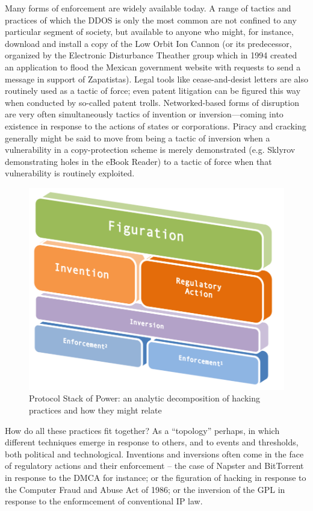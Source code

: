 \documentclass[10pt,letter,oneside]{scrartcl}
\begin{document}
Many forms of enforcement are widely available today.  A range of tactics and
practices of which the DDOS is only the most common are not confined to any
particular segment of society, but available to anyone who might, for instance,
download and install a copy of the Low Orbit Ion Cannon (or its predecessor,
organized by the Electronic Disturbance Theather group which in 1994 created an
application to flood the Mexican government website with requests to send a
message in support of Zapatistas).  Legal tools like cease-and-desist letters
are also routinely used as a tactic of force; even patent litigation can be
figured this way when conducted by so-called patent trolls.  Networked-based
forms of disruption are very often simultaneously tactics of invention or
inversion—coming into existence in response to the actions of states or
corporations.  Piracy and cracking generally might be said to move from being a
tactic of inversion when a vulnerability in a copy-protection scheme is merely
demonstrated (e.g. Sklyrov demonstrating holes in the eBook Reader) to a tactic
of force when that vulnerability is routinely exploited.


\begin{figure} \centering \includegraphics{images/protocolstackV2}
\caption{Protocol Stack of Power: an analytic decomposition of hacking
practices and how they might relate} \label{fig:ProtocolStack} \end{figure}


How do all these practices fit together?  As a ``topology'' perhaps, in which
different techniques emerge in response to others, and to events and
thresholds, both political and technological.  Inventions and inversions often
come in the face of regulatory actions and their enforcement -- the case of
Napster and BitTorrent in response to the DMCA for instance; or the figuration
of hacking in response to the Computer Fraud and Abuse Act of 1986; or the
inversion of the GPL in response to the enformcement of conventional IP law.
\end{document}
